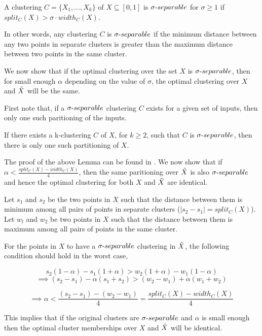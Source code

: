 \begin{definition}
   \cite{ben2014clustering} A clustering $C = \{X_1, \ldots, X_k\}$ of $X \subseteq [0, 1]$ is $\sigma\text{-}separable$ for $\sigma \geq 1$ if  $split_C(X) > \sigma \cdot width_C(X)$.
\end{definition}

In other words, any clustering $C$ is $\sigma\text{-}separable$ if the minimum distance between any two points in separate clusters is greater than the maximum distance between two points in the same cluster. 

We now show that if the optimal clustering over the set $X$ is $\sigma\text{-}separable$, then for small enough $\alpha$ depending on the value of $\sigma$, the optimal clustering over $X$ and $\tilde{X}$ will be the same. 

First note that, if a $\sigma\text{-}separable$ clustering $C$ exists for a given set of inputs, then only one such paritioning of the inputs. 

\begin{lemma}
    \cite{ackerman2009clusterability} If there exists a k-clustering $C$ of $X$, for $k \geq 2$, such that $C$ is $\sigma\text{-}separable$, then there is only one such partitioning of $X$.
\end{lemma}

The proof of the above Lemma can be found in \cite{ackerman2009clusterability}. We now show that if $\alpha < \frac{split_C(X) - width_C(X)}{4}$, then the same paritioning over $\tilde{X}$ is also $\sigma\text{-}separable$ and hence the optimal clustering for both $X$ and $\tilde{X}$ are identical.

Let $s_1$ and $s_2$ be the two points in $X$ such that the distance between them is minimum among all pairs of points in separate clusters ($|s_2 - s_1| = split_C(X)$). Let $w_l$ and $w_2$ be two points in $X$ such that the distance between them is maximum among all pairs of points in the same cluster.

For the points in $X$ to have a $\sigma\text{-}separable$ clustering in $\tilde{X}$, the following condition should hold in the worst case,

\[
 s_2 (1-\alpha) - s_1 (1+\alpha) > w_2 (1+\alpha) - w_1 (1 -\alpha)
\]
\[
\implies (s_2 - s_1) - \alpha (s_1 + s_2) > (w_2 - w_1) + \alpha (w_1 + w_2)
\]

\[
\implies \alpha < \frac{(s_2 - s_1) - (w_2 - w_1)}{4} = \frac{split_C(X) - width_C(X)}{4}
\]

This implies that if the original clusters are $\sigma\text{-}separable$ and $\alpha$ is small enough then the optimal cluster memberships over $X$ and $\tilde{X}$ will be identical. 








